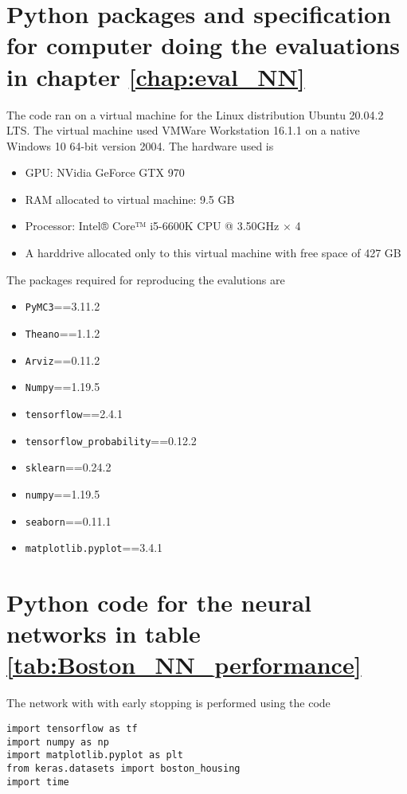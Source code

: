\begin{appendices}
\begin{lstlisting}
\end{lstlisting}





\section{Python packages and specification for computer doing the evaluations in chapter \ref{chap:eval_NN}} \label{app:specs}
The code ran on a virtual machine for the Linux distribution Ubuntu 20.04.2 LTS. The virtual machine used VMWare Workstation 16.1.1 on a native Windows 10 64-bit version 2004. The hardware used is
\begin{itemize}
    \item GPU: NVidia GeForce GTX 970
    \item RAM allocated to virtual machine: 9.5 GB
    \item Processor: Intel® Core™ i5-6600K CPU @ 3.50GHz × 4
    \item A harddrive allocated only to this virtual machine with free space of 427 GB
\end{itemize}
The packages required for reproducing the evalutions are 
\begin{itemize}
    \item \texttt{PyMC3}==3.11.2
    \item \texttt{Theano}==1.1.2
    \item \texttt{Arviz}==0.11.2
    \item \texttt{Numpy}==1.19.5
    \item \texttt{tensorflow}==2.4.1
    \item \texttt{tensorflow\_probability}==0.12.2
    \item \texttt{sklearn}==0.24.2
    \item \texttt{numpy}==1.19.5
    \item \texttt{seaborn}==0.11.1
    \item \texttt{matplotlib.pyplot}==3.4.1
\end{itemize}



\section{Python code for the neural networks in table \ref{tab:Boston_NN_performance}} \label{app:Boston_NN}
The network with with early stopping is performed using the code
\begin{lstlisting}
import tensorflow as tf
import numpy as np
import matplotlib.pyplot as plt
from keras.datasets import boston_housing
import time



\end{lstlisting}
\end{appendices}
